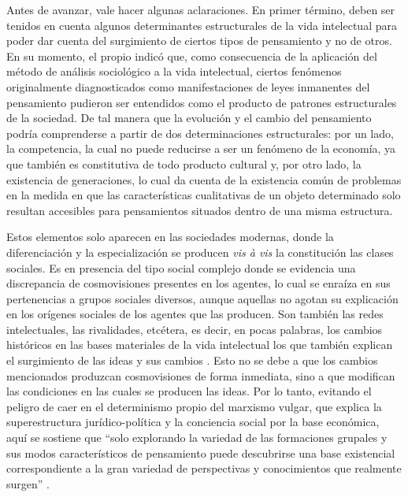 Antes de avanzar, vale hacer algunas aclaraciones. En primer término, deben ser tenidos en cuenta algunos determinantes estructurales de la vida intelectual para poder dar cuenta del surgimiento de ciertos tipos de pensamiento y no de otros. En su momento, el propio \textcite{1709-MANNHEIM1971} indicó que, como consecuencia de la aplicación del método de análisis sociológico a la vida intelectual, ciertos fenómenos originalmente diagnosticados como manifestaciones de leyes inmanentes del pensamiento pudieron ser entendidos como el producto de patrones estructurales de la sociedad. De tal manera que la evolución y el cambio del pensamiento podría comprenderse a partir de dos determinaciones estructurales: por un lado, la competencia, la cual no puede reducirse a ser un fenómeno de la economía, ya que también es constitutiva de todo producto cultural y, por otro lado, la existencia de generaciones, lo cual da cuenta de la existencia común de problemas en la medida en que las características cualitativas de un objeto determinado solo resultan accesibles para pensamientos situados dentro de una misma estructura.

Estos elementos solo aparecen en las sociedades modernas, donde la diferenciación y la especialización se producen \emph{vis à vis} la constitución las clases sociales. Es en presencia del tipo social complejo donde se evidencia una discrepancia de cosmovisiones presentes en los agentes, lo cual se enraíza en sus pertenencias a grupos sociales diversos, aunque aquellas no agotan su explicación en los orígenes sociales de los agentes que las producen. Son también las redes intelectuales, las rivalidades, etcétera, es decir, en pocas palabras, los cambios históricos en las bases materiales de la vida intelectual los que también explican el surgimiento de las ideas y sus cambios \parencite{1584-COLLINS2000}. Esto no se debe a que los cambios mencionados produzcan cosmovisiones de forma inmediata, sino a que modifican las condiciones en las cuales se producen las ideas. Por lo tanto, evitando el peligro de caer en el determinismo propio del marxismo vulgar, que explica la superestructura jurídico-política y la conciencia social por la base económica, aquí se sostiene que \enquote{solo explorando la variedad de las formaciones grupales  y sus modos característicos de pensamiento puede descubrirse una base existencial correspondiente a la gran variedad de perspectivas y conocimientos que realmente surgen} \parencite[58]{1704-MERTON1977}.

